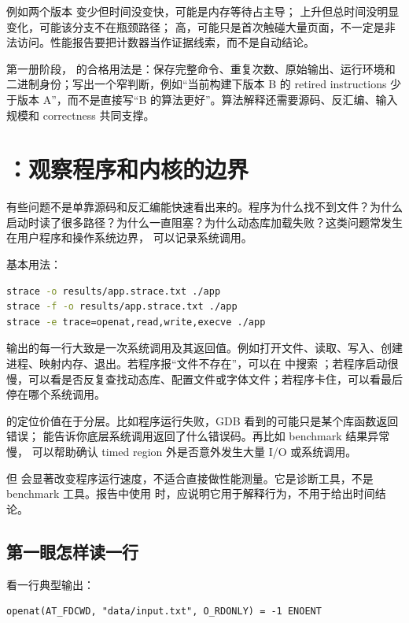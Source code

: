 例如两个版本  变少但时间没变快，可能是内存等待占主导； 上升但总时间没明显变化，可能该分支不在瓶颈路径； 高，可能只是首次触碰大量页面，不一定是非法访问。性能报告要把计数器当作证据线索，而不是自动结论。

第一册阶段， 的合格用法是：保存完整命令、重复次数、原始输出、运行环境和二进制身份；写出一个窄判断，例如“当前构建下版本 B 的 retired instructions 少于版本 A”，而不是直接写“B 的算法更好”。算法解释还需要源码、反汇编、输入规模和 correctness 共同支撑。

\section{：观察程序和内核的边界}

有些问题不是单靠源码和反汇编能快速看出来的。程序为什么找不到文件？为什么启动时读了很多路径？为什么一直阻塞？为什么动态库加载失败？这类问题常发生在用户程序和操作系统边界， 可以记录系统调用。

基本用法：

\begin{lstlisting}[language=bash]
strace -o results/app.strace.txt ./app
strace -f -o results/app.strace.txt ./app
strace -e trace=openat,read,write,execve ./app
\end{lstlisting}

 输出的每一行大致是一次系统调用及其返回值。例如打开文件、读取、写入、创建进程、映射内存、退出。若程序报“文件不存在”，可以在  中搜索 ；若程序启动很慢，可以看是否反复查找动态库、配置文件或字体文件；若程序卡住，可以看最后停在哪个系统调用。

 的定位价值在于分层。比如程序运行失败，GDB 看到的可能只是某个库函数返回错误； 能告诉你底层系统调用返回了什么错误码。再比如 benchmark 结果异常慢， 可以帮助确认 timed region 外是否意外发生大量 I/O 或系统调用。

但  会显著改变程序运行速度，不适合直接做性能测量。它是诊断工具，不是 benchmark 工具。报告中使用  时，应说明它用于解释行为，不用于给出时间结论。

\subsection{第一眼怎样读一行 }

看一行典型输出：

\begin{lstlisting}[numbers=none,caption={打开文件失败的一行系统调用}]
openat(AT_FDCWD, "data/input.txt", O_RDONLY) = -1 ENOENT
\end{lstlisting}

